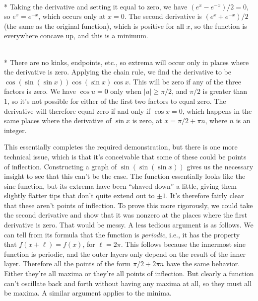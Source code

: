 \\*
Taking the derivative and setting it equal to zero, we have $\left(e^x-e^{-x}\right)/2=0$, so $e^x=e^{-x}$, which
occurs only at $x=0$. The second derivative is $\left(e^x+e^{-x}\right)/2$ (the same as the original function),
which is positive for all $x$, so the function is everywhere concave up, and this is a minimum.

\\*
There are no kinks, endpoints, etc., so
extrema will occur only in places where the derivative is zero.
Applying the chain rule, we find the derivative to be $\cos(\sin(\sin x))\cos(\sin x)\cos x$.
This will be zero if any of the three factors is zero. We have $\cos u=0$ only when $|u| \ge \pi/2$,
and $\pi/2$ is greater than 1, so it's not possible for either of the first two factors to equal zero.
The derivative will therefore equal zero if and only if $\cos x=0$, which happens in the same places
where the derivative of $\sin x$ is zero, at $x=\pi/2+\pi n$, where $n$ is an integer.
%

This essentially completes the required demonstration, but there is one more technical issue, which
is that it's conceivable that some of these could
be points of inflection. Constructing a graph of $\sin(\sin(\sin x))$ gives us the necessary
insight to see that this can't be the case. The function essentially looks like the sine function, but
its extrema have been ``shaved down'' a little, giving them slightly flatter tips that don't quite extend
out to $\pm 1$. It's therefore fairly clear that these aren't points of inflection.
To prove this more rigorously, we could take the second derivative and show that it was
nonzero at the places where the first derivative is zero. That would be messy. A less tedious argument is
as follows. We can tell from its formula that the function is \emph{periodic}, i.e., it has the property that
$f(x+\ell)=f(x)$, for $\ell=2\pi$. This follows because the innermost sine function is periodic, and the outer layers only
depend on the result of the inner layer. Therefore all the points of the form $\pi/2+2\pi n$
have the same behavior. Either they're all maxima or they're all points of inflection. But clearly a
function can't oscillate back and forth without having any maxima at all, so they must all be maxima. A
similar argument applies to the minima.



